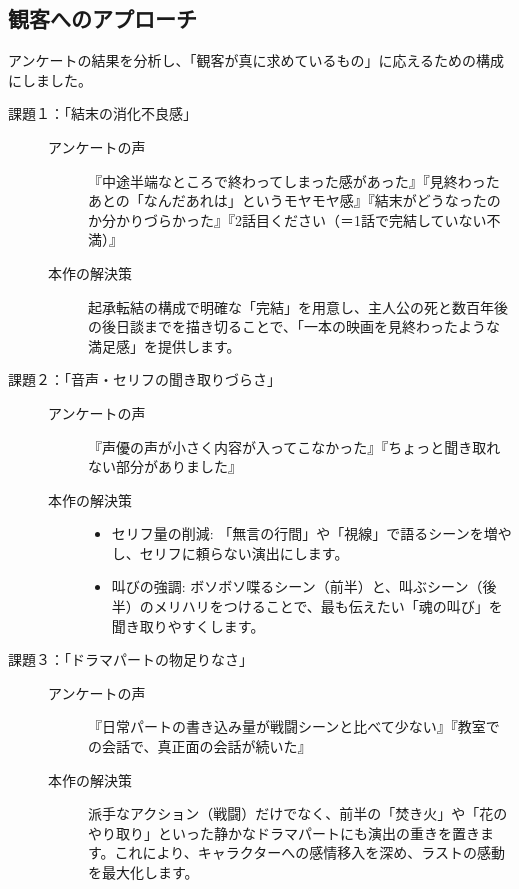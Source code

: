 \subsection{観客へのアプローチ}
アンケートの結果を分析し、「観客が真に求めているもの」に応えるための構成にしました。
\begin{description}
    \item [課題１：「結末の消化不良感」] 
    \begin{description}
        \item []
        \item [アンケートの声] 『中途半端なところで終わってしまった感があった』『見終わったあとの「なんだあれは」というモヤモヤ感』『結末がどうなったのか分かりづらかった』『2話目ください（＝1話で完結していない不満）』
        \item [本作の解決策] 起承転結の構成で明確な「完結」を用意し、主人公の死と数百年後の後日談までを描き切ることで、「一本の映画を見終わったような満足感」を提供します。
    \end{description}
    \item [課題２：「音声・セリフの聞き取りづらさ」] 
    \begin{description}
        \item []
        \item [アンケートの声] 『声優の声が小さく内容が入ってこなかった』『ちょっと聞き取れない部分がありました』
        \item [本作の解決策] 
            \begin{itemize}
                \item セリフ量の削減: 「無言の行間」や「視線」で語るシーンを増やし、セリフに頼らない演出にします。
                \item 叫びの強調: ボソボソ喋るシーン（前半）と、叫ぶシーン（後半）のメリハリをつけることで、最も伝えたい「魂の叫び」を聞き取りやすくします。
            \end{itemize}
    \end{description}
    \item [課題３：「ドラマパートの物足りなさ」] 
    \begin{description}
        \item []
        \item [アンケートの声] 『日常パートの書き込み量が戦闘シーンと比べて少ない』『教室での会話で、真正面の会話が続いた』
        \item [本作の解決策] 派手なアクション（戦闘）だけでなく、前半の「焚き火」や「花のやり取り」といった静かなドラマパートにも演出の重きを置きます。これにより、キャラクターへの感情移入を深め、ラストの感動を最大化します。
    \end{description}
\end{description}



